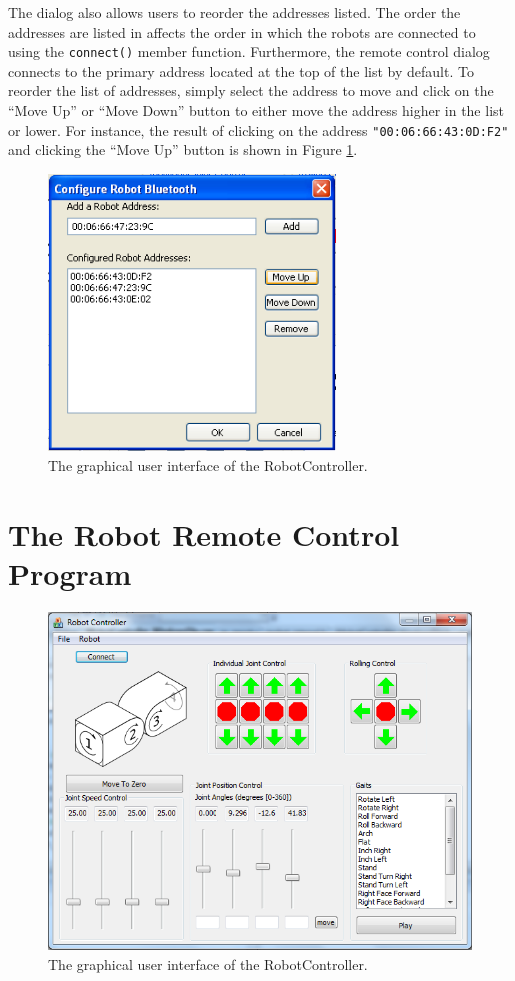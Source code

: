 \documentclass{article}
\begin{document}
The dialog also allows users to reorder the addresses listed. The
order the addresses are listed in affects the order in which the robots
are connected to using the \texttt{connect()} member function. Furthermore,
the remote control dialog connects to the primary address located at the
top of the list by default. To reorder the list of addresses, simply
select the address to move and click on the ``Move Up'' or ``Move Down''
button to either move the address higher in the list or lower. For instance,
the result of clicking on the address \texttt{"00:06:66:43:0D:F2"} and clicking
the ``Move Up'' button is shown in Figure \ref{fig:shot10.png}.

\begin{figure}[H]
\begin{center}
\includegraphics[width=3in]{images/shot10.png}
\end{center}
\caption{\label{fig:shot10.png} The graphical user interface of the RobotController.}
\end{figure}

\section{ The Robot Remote Control Program }
\begin{figure}[H]
\begin{center}
\includegraphics[width=4.5in]{images/shot1_populated.png}
\end{center}
\caption{\label{fig:shot1_populated.png} The graphical user interface of the RobotController.}
\end{figure}
\end{document}
